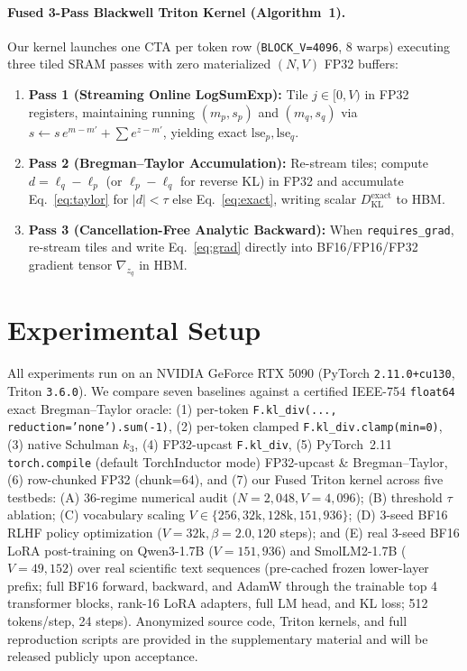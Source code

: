 \documentclass[10pt,twocolumn]{article}
\newcommand{\KL}{D_{\mathrm{KL}}}
\begin{document}
\paragraph{Fused 3-Pass Blackwell Triton Kernel (Algorithm~1).} Our kernel launches one CTA per token row (\texttt{BLOCK\_V=4096}, 8 warps) executing three tiled SRAM passes with zero materialized $(N,V)$ FP32 buffers:
\begin{enumerate}[leftmargin=1.6em,itemsep=1pt,topsep=2pt]
  \item \textbf{Pass 1 (Streaming Online LogSumExp):} Tile $j \in [0, V)$ in FP32 registers, maintaining running $(m_p, s_p)$ and $(m_q, s_q)$ via $s \leftarrow s\,e^{m - m'} + \sum e^{z - m'}$, yielding exact $\mathrm{lse}_p, \mathrm{lse}_q$.
  \item \textbf{Pass 2 (Bregman--Taylor Accumulation):} Re-stream tiles; compute $d = \ell_q - \ell_p$ (or $\ell_p - \ell_q$ for reverse KL) in FP32 and accumulate Eq.~\eqref{eq:taylor} for $|d| < \tau$ else Eq.~\eqref{eq:exact}, writing scalar $\KL^{\mathrm{exact}}$ to HBM.
  \item \textbf{Pass 3 (Cancellation-Free Analytic Backward):} When \texttt{requires\_grad}, re-stream tiles and write Eq.~\eqref{eq:grad} directly into BF16/FP16/FP32 gradient tensor $\nabla_{z_q}$ in HBM.
\end{enumerate}

\section{Experimental Setup}
All experiments run on an NVIDIA GeForce RTX 5090 (PyTorch \texttt{2.11.0+cu130}, Triton \texttt{3.6.0}). We compare seven baselines against a certified IEEE-754 \texttt{float64} exact Bregman--Taylor oracle: (1) per-token \texttt{F.kl\_div(..., reduction='none').sum(-1)}, (2) per-token clamped \texttt{F.kl\_div.clamp(min=0)}, (3) native Schulman $k_3$, (4) FP32-upcast \texttt{F.kl\_div}, (5) PyTorch~2.11 \texttt{torch.compile} (default TorchInductor mode) FP32-upcast \& Bregman--Taylor, (6) row-chunked FP32 (chunk=64), and (7) our Fused Triton kernel across five testbeds: (A) 36-regime numerical audit ($N=2{,}048, V=4{,}096$); (B) threshold $\tau$ ablation; (C) vocabulary scaling $V \in \{256, 32\text{k}, 128\text{k}, 151{,}936\}$; (D) 3-seed BF16 RLHF policy optimization ($V=32\text{k}, \beta=2.0, 120$ steps); and (E) real 3-seed BF16 LoRA post-training on Qwen3-1.7B ($V=151{,}936$) and SmolLM2-1.7B ($V=49{,}152$) over real scientific text sequences (pre-cached frozen lower-layer prefix; full BF16 forward, backward, and AdamW through the trainable top 4 transformer blocks, rank-16 LoRA adapters, full LM head, and KL loss; 512 tokens/step, 24 steps). Anonymized source code, Triton kernels, and full reproduction scripts are provided in the supplementary material and will be released publicly upon acceptance.
\end{document}
